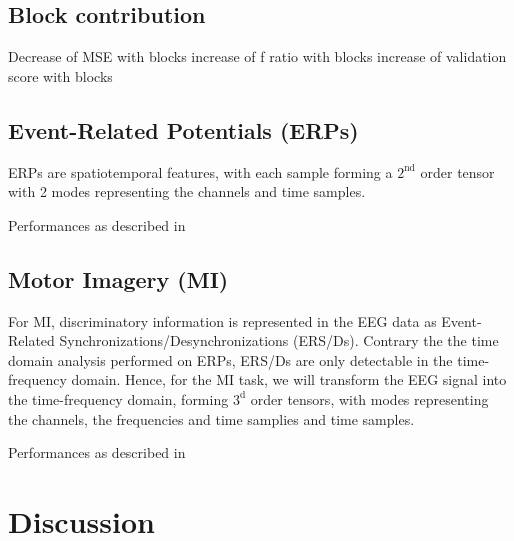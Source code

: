 \documentclass[twocolumn]{article}
\begin{document}
\subsection{Block contribution}
Decrease of MSE with blocks
increase of f ratio with blocks
increase of validation score with blocks
\begin{figure*}
  
\end{figure*}
\subsection{Event-Related Potentials (ERPs)}
ERPs are spatiotemporal features, with each sample forming a $2^\text{nd}$
order tensor with 2 modes representing the channels and time samples.
\begin{table*}
  \footnotesize
  
  \caption{Performances as described in \cite{Chevallier2024}}
\end{table*}
\subsection{Motor Imagery (MI)}
For MI, discriminatory information is represented in the EEG data as
Event-Related Synchronizations/Desynchronizations (ERS/Ds).
Contrary the the time domain analysis performed on ERPs, ERS/Ds are only
detectable in the time-frequency domain.
Hence, for the MI task, we will transform the EEG signal into the
time-frequency domain, forming $3^\text{d}$ order tensors, with modes
representing the channels, the frequencies and time samplies and time samples.

\begin{table}
  \caption{Performances as described in \cite{Chevallier2024}}
\end{table}
\section{Discussion}


\printbibliography
\end{document}
